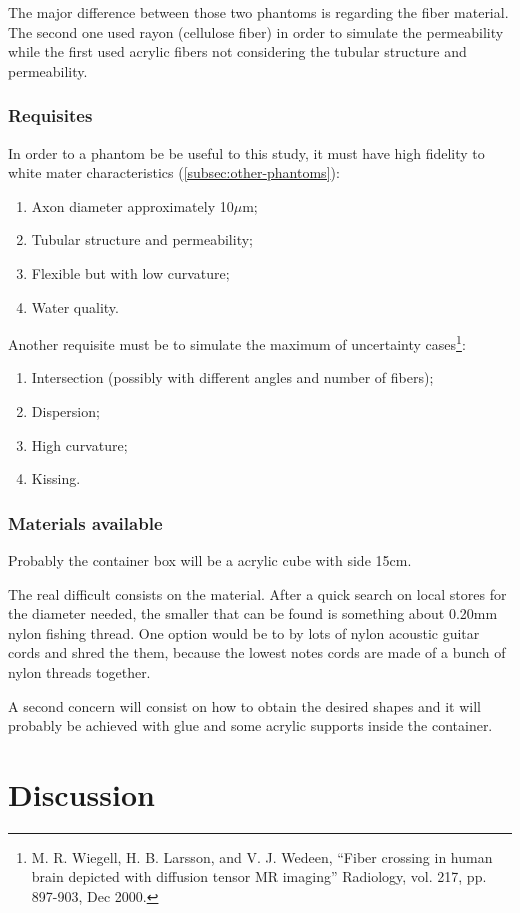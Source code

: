 \documentclass[a4paper,11pt]{report}
\begin{document}
  The major difference between those two phantoms is regarding the fiber material. The second one used rayon (cellulose fiber) in order to simulate the permeability while the first used acrylic fibers not considering the tubular structure and permeability.

  \subsection{Requisites}
  In order to a phantom be be useful to this study, it must have high fidelity to white mater characteristics (\ref{subsec:other-phantoms}):

  \begin{enumerate}
    \item Axon diameter approximately 10$\mu$m;
    \item Tubular structure and permeability;
    \item Flexible but with low curvature;
    \item Water quality.
  \end{enumerate}

  Another requisite must be to simulate the maximum of uncertainty cases\footnote{M. R. Wiegell, H. B. Larsson, and V. J. Wedeen, ``Fiber crossing in human brain depicted with diffusion tensor MR imaging'' Radiology, vol. 217, pp. 897-903, Dec 2000.}:

  \begin{enumerate}
    \item Intersection (possibly with different angles and number of fibers);
    \item Dispersion;
    \item High curvature;
    \item Kissing.
  \end{enumerate}

  \subsection{Materials available}
  Probably the container box will be a acrylic cube with side 15cm.

  The real difficult consists on the material. After a quick search on local stores for the diameter needed, the smaller that can be found is something about 0.20mm nylon fishing thread. One option would be to by lots of nylon acoustic guitar cords and shred the them, because the lowest notes cords are made of a bunch of nylon threads together.

  A second concern will consist on how to obtain the desired shapes and it will probably be achieved with glue and some acrylic supports inside the container.

\chapter{Discussion}
\end{document}
